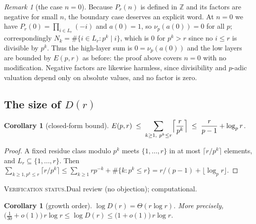 \documentclass[11pt]{article}
\theoremstyle{plain}
\newtheorem{corollary}[theorem]{Corollary}
\theoremstyle{definition}
\theoremstyle{remark}
\newtheorem{nremark}[theorem]{Remark}
\numberwithin{equation}{section}
\newcommand{\Z}{\mathbb{Z}}
\newcommand{\Lr}{L_r}
\newcommand{\vstatus}[1]{%
  \par\vspace{3pt}\noindent
  {\small\textsc{Verification status.}\enspace #1}\par\vspace{3pt}}
\begin{document}
\begin{nremark}[the case $n = 0$]
\label{rem:n0}
Because $P_r(n)$ is defined in $\Z$ and its factors are negative for small $n$, the boundary case
deserves an explicit word. At $n=0$ we have $P_r(0) = \prod_{i \in \Lr}(-i)$ and $a(0)=1$, so
$\nu_p(a(0)) = 0$ for all $p$; correspondingly $N_k = \#\{i \in \Lr : p^k \mid i\}$, which is $0$
for $p^k > r$ since no $i \le r$ is divisible by $p^k$. Thus the high-layer sum is $0 =
\nu_p(a(0))$ and the low layers are bounded by $E(p,r)$ as before: the proof above covers $n=0$
with no modification. Negative factors are likewise harmless, since divisibility and $p$-adic
valuation depend only on absolute values, and no factor is zero.
\end{nremark}

\subsection{The size of $D(r)$}

\begin{corollary}[closed-form bound]
\label{cor:crude}
$\displaystyle E(p,r) \;\le\; \sum_{k \ge 1,\ p^k \le r} \Bigl\lceil \frac{r}{p^k}\Bigr\rceil
 \;\le\; \frac{r}{p-1} + \log_p r$.
\end{corollary}

\begin{proof}
A fixed residue class modulo $p^k$ meets $\{1,\dots,r\}$ in at most $\lceil r/p^k\rceil$
elements, and $\Lr \subseteq \{1,\dots,r\}$. Then
$\sum_{k \ge 1, p^k \le r}\lceil r/p^k\rceil \le \sum_{k\ge1} r p^{-k} + \#\{k : p^k \le r\}
= r/(p-1) + \lfloor \log_p r\rfloor$.
\end{proof}
\vstatus{Dual review (no objection); computational.}

\begin{corollary}[growth order]
\label{cor:growth}
$\log D(r) = \Theta(r \log r)$. More precisely,
$\bigl(\tfrac{1}{30}+o(1)\bigr)\, r\log r \le \log D(r) \le \bigl(1+o(1)\bigr)\, r \log r$.
\end{corollary}
\end{document}
